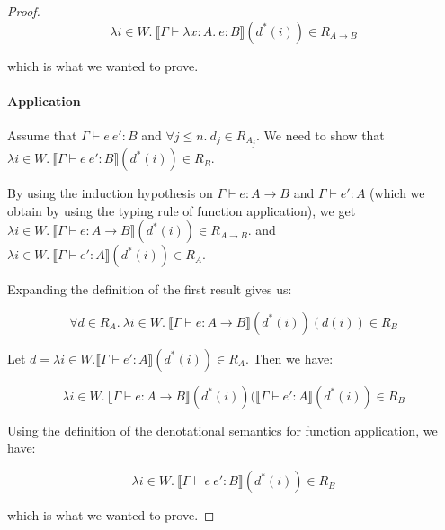 \begin{proof}
\[\lambda i \in W. \  \llbracket \Gamma \vdash \lambda x : A. \ e : B \rrbracket (d^*(i)) \in R_{A \to B}\]

which is what we wanted to prove.

\paragraph{Application} Assume that $\Gamma \vdash e \ e' :  B$ and $\forall j \leq n. \ d_j \in R_{A_j}$. We need to show that $\lambda i \in W. \  \llbracket \Gamma \vdash  e \ e' : B \rrbracket (d^*(i)) \in R_B$.

By using the induction hypothesis on $\Gamma \vdash e : A \to B$ and $\Gamma \vdash e' : A$ (which we obtain by using the typing rule of function application), we get 
$\lambda i \in W. \  \llbracket \Gamma \vdash e : A \to B \rrbracket(d^*(i)) \in R_{A \to B}$. and $\lambda i \in W. \ \llbracket \Gamma \vdash e' : A \rrbracket(d^*(i)) \in R_{A}$.

Expanding the definition of the first result gives us:

\[ \forall d \in R_A. \  \lambda i \in W. \  \llbracket \Gamma \vdash e : A \to B \rrbracket(d^*(i))(d(i)) \in R_B \]

Let $d = \lambda i \in W. \llbracket \Gamma \vdash e' : A  \rrbracket(d^*(i)) \in R_A$. Then we have:

\[  \lambda i \in W. \  \llbracket \Gamma \vdash e : A \to B \rrbracket(d^*(i))( \llbracket \Gamma \vdash e' : A \rrbracket(d^*(i)) \in R_B \]
 
Using the definition of the denotational semantics for function application, we have:

\[\lambda i \in W. \  \llbracket \Gamma \vdash  e \ e' : B \rrbracket (d^*(i)) \in R_B\]

which is what we wanted to prove.
\end{proof}